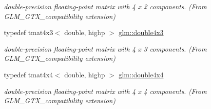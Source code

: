 \begin{DoxyCompactItemize}
\begin{DoxyCompactList}\small\item\em double-\/precision floating-\/point matrix with 4 x 2 components. (From G\-L\-M\-\_\-\-G\-T\-X\-\_\-compatibility extension) \end{DoxyCompactList}\item 
\hypertarget{group__gtx__compatibility_gadad0d5da7181385a05567469d4a5dd9a}{typedef tmat4x3$<$ double, highp $>$ \hyperlink{group__gtx__compatibility_gadad0d5da7181385a05567469d4a5dd9a}{glm\-::double4x3}}\label{group__gtx__compatibility_gadad0d5da7181385a05567469d4a5dd9a}

\begin{DoxyCompactList}\small\item\em double-\/precision floating-\/point matrix with 4 x 3 components. (From G\-L\-M\-\_\-\-G\-T\-X\-\_\-compatibility extension) \end{DoxyCompactList}\item 
\hypertarget{group__gtx__compatibility_ga83ac0f28025f5e999b03094400fbddcb}{typedef tmat4x4$<$ double, highp $>$ \hyperlink{group__gtx__compatibility_ga83ac0f28025f5e999b03094400fbddcb}{glm\-::double4x4}}\label{group__gtx__compatibility_ga83ac0f28025f5e999b03094400fbddcb}

\begin{DoxyCompactList}\small\item\em double-\/precision floating-\/point matrix with 4 x 4 components. (From G\-L\-M\-\_\-\-G\-T\-X\-\_\-compatibility extension) \end{DoxyCompactList}\end{DoxyCompactItemize}
